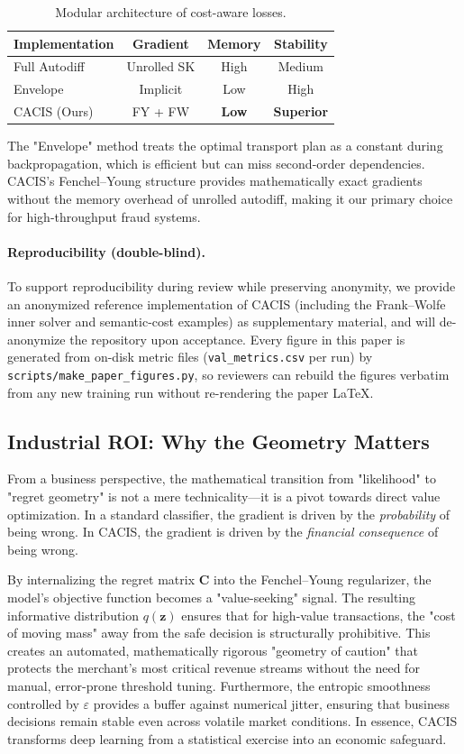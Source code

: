 \documentclass[sigconf,anonymous]{acmart}
\newcommand{\CACIS}{\textsc{CACIS}}
\newcommand{\vz}{\mathbf{z}}
\newcommand{\mC}{\mathbf{C}}
\begin{document}
\begin{table}[h]
\centering
\caption{Modular architecture of cost-aware losses.}
\label{tab:implementations}
\begin{tabular}{lccc}
\toprule
\textbf{Implementation} & \textbf{Gradient} & \textbf{Memory} & \textbf{Stability} \\
\midrule
Full Autodiff & Unrolled SK & High & Medium \\
Envelope & Implicit & Low & High \\
\CACIS{} (Ours) & FY + FW & \textbf{Low} & \textbf{Superior} \\
\bottomrule
\end{tabular}
\end{table}

The "Envelope" method treats the optimal transport plan as a constant during backpropagation, which is efficient but can miss second-order dependencies. \CACIS{}'s Fenchel--Young structure provides mathematically exact gradients without the memory overhead of unrolled autodiff, making it our primary choice for high-throughput fraud systems.

\paragraph{Reproducibility (double-blind).}
To support reproducibility during review while preserving anonymity, we provide an anonymized reference implementation of \CACIS{} (including the Frank--Wolfe inner solver and semantic-cost examples) as supplementary material, and will de-anonymize the repository upon acceptance. Every figure in this paper is generated from on-disk metric files (\texttt{val\_metrics.csv} per run) by \texttt{scripts/make\_paper\_figures.py}, so reviewers can rebuild the figures verbatim from any new training run without re-rendering the paper LaTeX.

\subsection{Industrial ROI: Why the Geometry Matters}
From a business perspective, the mathematical transition from "likelihood" to "regret geometry" is not a mere technicality—it is a pivot towards direct value optimization. In a standard classifier, the gradient is driven by the \emph{probability} of being wrong. In \CACIS{}, the gradient is driven by the \emph{financial consequence} of being wrong.

By internalizing the regret matrix $\mC$ into the Fenchel--Young regularizer, the model's objective function becomes a "value-seeking" signal. The resulting informative distribution $q(\vz)$ ensures that for high-value transactions, the "cost of moving mass" away from the safe decision is structurally prohibitive. This creates an automated, mathematically rigorous "geometry of caution" that protects the merchant's most critical revenue streams without the need for manual, error-prone threshold tuning. Furthermore, the entropic smoothness controlled by $\varepsilon$ provides a buffer against numerical jitter, ensuring that business decisions remain stable even across volatile market conditions. In essence, \CACIS{} transforms deep learning from a statistical exercise into an economic safeguard.
\end{document}
